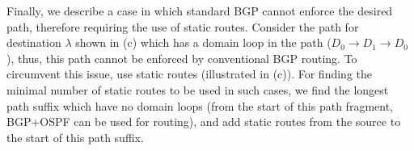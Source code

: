 Finally, we describe a case in which standard BGP cannot enforce
the desired path, therefore requiring the use of static routes.
Consider the path for destination $\lambda$ 
shown in (c) which has a domain loop in the path
($D_0 \rightarrow D_1 \rightarrow D_0$), thus, this path cannot be
enforced by conventional BGP routing.
To circumvent this issue, \name use static routes 
(illustrated in (c)). 
For finding the minimal number of static routes to be used in
such cases, we find the longest path suffix which have
no domain loops (from the start of this path fragment, 
BGP+OSPF can be used for routing), 
and add static routes from the source to the start of this path suffix.
 




